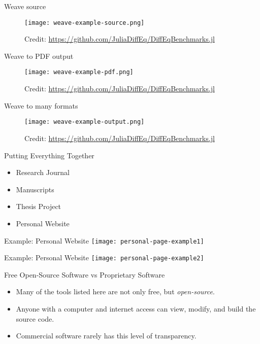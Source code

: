 \documentclass{beamer}
\begin{document}
\begin{frame}{Weave source}
  \begin{figure}[]
    \centering
    \texttt{[image: weave-example-source.png]}
    \caption{
      Credit: \url{https://github.com/JuliaDiffEq/DiffEqBenchmarks.jl}
    }
  \end{figure}
\end{frame}

\begin{frame}{Weave to PDF output}
  \begin{figure}[]
    \centering
    \texttt{[image: weave-example-pdf.png]}
    \caption{
      Credit: \url{https://github.com/JuliaDiffEq/DiffEqBenchmarks.jl}
    }
  \end{figure}
\end{frame}

\begin{frame}{Weave to many formats}
  \begin{figure}[]
    \centering
    \texttt{[image: weave-example-output.png]}
    \caption{
      Credit: \url{https://github.com/JuliaDiffEq/DiffEqBenchmarks.jl}
    }
  \end{figure}
\end{frame}

\begin{frame}{Putting Everything Together}
  \begin{itemize}
    \item Research Journal

    \item Manuscripts

    \item Thesis Project

    \item Personal Website
  \end{itemize}
\end{frame}

\begin{frame}{Example: Personal Website}
  \center
  \texttt{[image: personal-page-example1]}
\end{frame}

\begin{frame}{Example: Personal Website}
  \center
  \texttt{[image: personal-page-example2]}
\end{frame}

\begin{frame}{Free Open-Source Software vs Proprietary Software}
  \begin{itemize}
    \item Many of the tools listed here are not only free, but \textit{open-source}.

    \item Anyone with a computer and internet access can view, modify, and build the source code.

    \item Commercial software rarely has this level of transparency.
  \end{itemize}
\end{frame}
\end{document}
